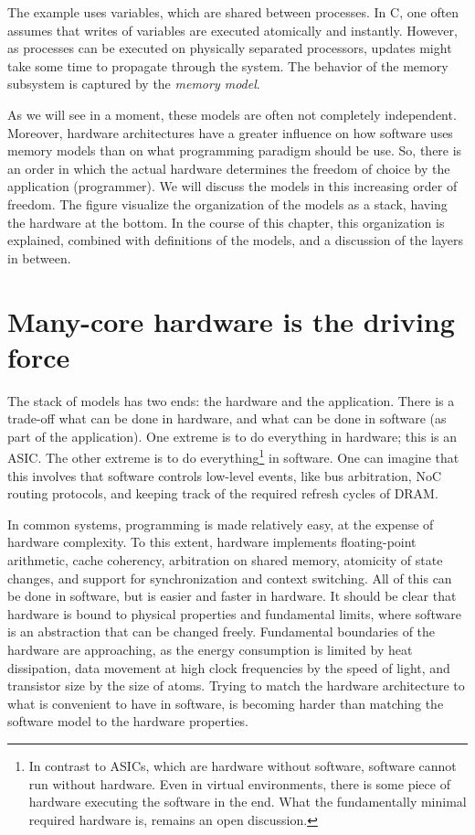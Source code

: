 The example uses variables, which are shared between processes.
In C, one often assumes that writes of variables are executed atomically and instantly.
However, as processes can be executed on physically separated processors, updates might take some time to propagate through the system.
The behavior of the memory subsystem is captured by the \emph{memory model}.

As we will see in a moment, these models are often not completely independent.
Moreover, hardware architectures have a greater influence on how software uses memory models than on what programming paradigm should be use.
So, there is an order in which the actual hardware determines the freedom of choice by the application (programmer).
We will discuss the models in this increasing order of freedom.
The figure \chapfigpageref visualize the organization of the models as a stack, having the hardware at the bottom.
In the course of this chapter, this organization is explained, combined with definitions of the models, and a discussion of the layers in between.


\section{Many-core hardware is the driving force}
\label{s:progmodel:hardware}

The stack of models has two ends: the hardware and the application.
There is a trade-off what can be done in hardware, and what can be done in software (as part of the application).
One extreme is to do everything in hardware; this is an \ac{ASIC}.
The other extreme is to do everything\footnote{%
	In contrast to \acp{ASIC}, which are hardware without software, software cannot run without hardware.
	Even in virtual environments, there is some piece of hardware executing the software in the end.
	What the fundamentally minimal required hardware is, remains an open discussion.
} in software.
One can imagine that this involves that software controls low-level events, like bus arbitration, \ac{NoC} routing protocols, and keeping track of the required refresh cycles of \ac{DRAM}.

In common systems, programming is made relatively easy, at the expense of hardware complexity.
To this extent, hardware implements floating-point arithmetic, cache coherency, arbitration on shared memory, atomicity of state changes, and support for synchronization and context switching.
All of this can be done in software, but is easier and faster in hardware.
It should be clear that hardware is bound to physical properties and fundamental limits, where software is an abstraction that can be changed freely.
Fundamental boundaries of the hardware are approaching, as the energy consumption is limited by heat dissipation, data movement at high clock frequencies by the speed of light, and transistor size by the size of atoms.
Trying to match the hardware architecture to what is convenient to have in software, is becoming harder than matching the software model to the hardware properties.

